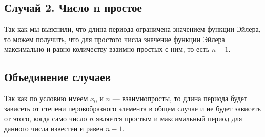 \documentclass[bachelor, och, labwork]{shiza}
\begin{document}
\subsection{Случай 2. Число n простое}

Так как мы выяснили, что длина периода ограничена значением функции Эйлера, то можем
получить, что для простого числа значение функции Эйлера максимально и равно количеству
взаимно простых с ним, то есть $n-1$.

\subsection{Объединение случаев}

Так как по условию имеем $x_0$ и $n$ --- взаимнопросты, то длина периода будет
зависеть от степени перовобразного элемента в общем случае и не будет зависеть от
этого, когда само число $n$ является простым и максимальный период для данного
числа известен и равен $n-1$.
\end{document}
